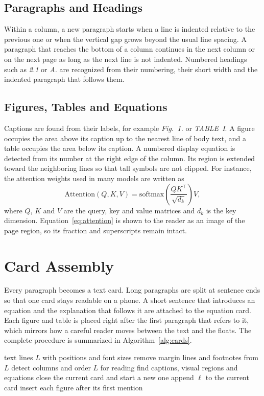 \documentclass[journal]{IEEEtran}
\begin{document}
\subsection{Paragraphs and Headings}
Within a column, a new paragraph starts when a line is indented relative to the previous one or when the vertical gap grows beyond the usual line spacing. A paragraph that reaches the bottom of a column continues in the next column or on the next page as long as the next line is not indented. Numbered headings such as \emph{2.1} or \emph{A.} are recognized from their numbering, their short width and the indented paragraph that follows them.

\subsection{Figures, Tables and Equations}
Captions are found from their labels, for example \emph{Fig.~1.} or \emph{TABLE~I}. A figure occupies the area above its caption up to the nearest line of body text, and a table occupies the area below its caption. A numbered display equation is detected from its number at the right edge of the column. Its region is extended toward the neighboring lines so that tall symbols are not clipped. For instance, the attention weights used in many models are written as
\begin{equation}
\mathrm{Attention}(Q, K, V) = \mathrm{softmax}\!\left(\frac{QK^{\top}}{\sqrt{d_k}}\right) V ,
\label{eq:attention}
\end{equation}
where $Q$, $K$ and $V$ are the query, key and value matrices and $d_k$ is the key dimension. Equation~\eqref{eq:attention} is shown to the reader as an image of the page region, so its fraction and superscripts remain intact.

\section{Card Assembly}
Every paragraph becomes a text card. Long paragraphs are split at sentence ends so that one card stays readable on a phone. A short sentence that introduces an equation and the explanation that follows it are attached to the equation card. Each figure and table is placed right after the first paragraph that refers to it, which mirrors how a careful reader moves between the text and the floats. The complete procedure is summarized in Algorithm~\ref{alg:cards}.

\begin{algorithm}[t]
\caption{Card assembly}
\label{alg:cards}
\begin{algorithmic}[1]
\Require text lines $L$ with positions and font sizes
\State remove margin lines and footnotes from $L$
\State detect columns and order $L$ for reading
\State find captions, visual regions and equations
    \State close the current card and start a new one
  \EndIf
  \State append $\ell$ to the current card
\EndFor
\State insert each figure after its first mention
\end{algorithmic}
\end{algorithm}
\end{document}
